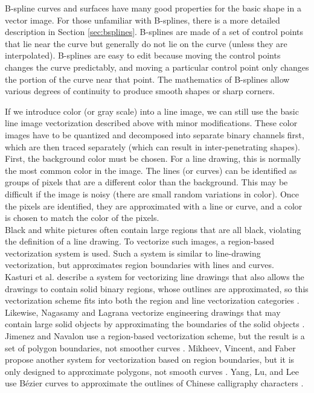 \documentclass[]{usiinfbachelorproject}
\begin{document}
B-spline curves and surfaces have many good properties for the basic shape in a vector image. For those unfamiliar with B-splines, there is a more detailed description in Section \ref{sec:bsplines}. B-splines are made of a set of control points that lie near the curve but generally do not lie on the curve (unless they are interpolated). B-splines are easy to edit because moving the control points changes the curve predictably, and moving a particular control point only changes the portion of the curve near that point. The mathematics of B-splines allow various degrees of continuity to produce smooth shapes or sharp corners.

If we introduce color (or gray scale) into a line image, we can still use the basic line image vectorization described above with minor modifications. These color images have to be quantized and decomposed into separate binary channels first, which are then traced separately (which can result in inter-penetrating shapes). First, the background color must be chosen. For a line drawing, this is normally the most common color in the image. The lines (or curves) can be identified as groups of pixels that are a different color than the background. This may be difficult if the image is noisy (there are small random variations in color). Once the pixels are identified, they are approximated with a line or curve, and a color is chosen to match the color of the pixels.\\
Black and white pictures often contain large regions that are all black, violating the definition of a line drawing. To vectorize such images, a region-based vectorization system is used. Such a system is similar to line-drawing vectorization, but approximates region boundaries with lines and curves.\\
Kasturi et al. describe a system for vectorizing line drawings that also allows the drawings to contain solid binary regions, whose outlines are approximated, so this vectorization scheme fits into both the region and line vectorization categories \cite{Kasturi1990}. Likewise, Nagasamy and Lagrana vectorize engineering drawings that may contain large solid objects by approximating the boundaries of the solid objects \cite{Nagasamy1990}. Jimenez and Navalon use a region-based vectorization scheme, but the result is a set of polygon boundaries, not smoother curves \cite{Jimenez1982}. Mikheev, Vincent, and Faber propose another system for vectorization based on region boundaries, but it is only designed to approximate polygons, not smooth curves \cite{Mikheev2001}. Yang, Lu, and Lee use B\'ezier curves to approximate the outlines of Chinese calligraphy characters \cite{Yang2001}.\\
\end{document}
